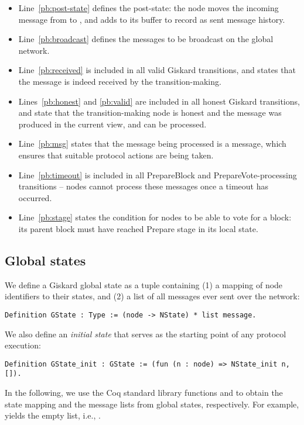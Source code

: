 \documentclass{easychair}
\begin{document}
\begin{itemize}[leftmargin=*]
\setlength\itemsep{-0.4em}
\item Line~\ref{pb:post-state} defines the post-state: the node moves the incoming message from  to , and adds  to its  buffer to record as sent message history. 
\item Line~\ref{pb:broadcast} defines the messages to be broadcast on the global network. 
\item Line~\ref{pb:received} is included in all valid Giskard transitions, and states that the message is indeed received by the transition-making.
\item Lines~\ref{pb:honest} and \ref{pb:valid} are included in all honest Giskard transitions, and state that the transition-making node is honest and the message was produced in the current view, and can be processed.
\item Line~\ref{pb:msg} states that the message being processed is a  message, which ensures that suitable protocol actions are being taken. 
\item Line~\ref{pb:timeout} is included in all PrepareBlock and PrepareVote-processing transitions -- nodes cannot process these messages once a timeout has occurred. 
\item Line~\ref{pb:stage} states the condition for nodes to be able to vote for a block: its parent block must have reached Prepare stage in its local state.
\end{itemize}

\subsection{Global states}
We define a Giskard global state as a tuple containing (1) a mapping of node identifiers to their states, and (2) a list of all messages ever sent over the network:
\begin{lstlisting}[language=Coq]
Definition GState : Type := (node -> NState) * list message.
\end{lstlisting}
We also define an \emph{initial state} that serves as the starting point of any protocol execution:
\begin{lstlisting}[language=Coq]
Definition GState_init : GState := (fun (n : node) => NState_init n, []).
\end{lstlisting}
In the following, we use the Coq standard library functions  and  to obtain the state mapping and the message lists from global states, respectively. For example,  yields the empty list, i.e., \CoqIn{[]}.
\end{document}
